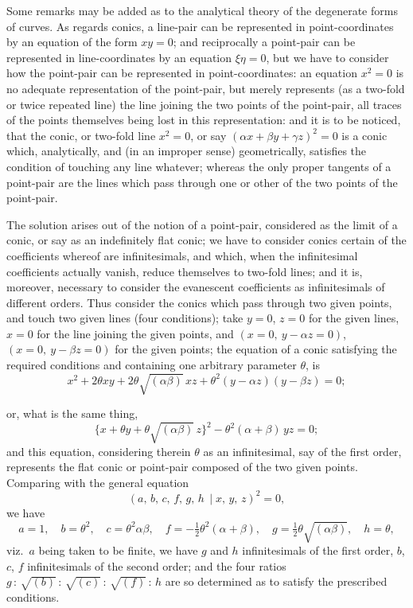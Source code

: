 \documentclass[11pt]{article}
\begin{document}
\medskip
\noindent
Some remarks may be added as to the analytical theory of the degenerate forms
of curves. As regards conics, a line-pair can be represented in
point-coordinates by an equation of the form $xy = 0$; and reciprocally a
point-pair can be represented in line-coordinates by an equation $\xi\eta = 0$,
but we have to consider how the point-pair can be represented in
point-coordinates: an equation $x^{2} = 0$ is no adequate representation of
the point-pair, but merely represents (as a two-fold or twice repeated line)
the line joining the two points of the point-pair, all traces of the points
themselves being lost in this representation: and it is to be noticed, that
the conic, or two-fold line $x^{2} = 0$, or say
$(\alpha x + \beta y + \gamma z)^{2} = 0$ is a conic which, analytically, and
(in an improper sense) geometrically, satisfies the condition of touching any
line whatever; whereas the only proper tangents of a point-pair are the lines
which pass through one or other of the two points of the point-pair.

The solution arises out of the notion of a point-pair, considered as the
limit of a conic, or say as an indefinitely flat conic; we have to consider
conics certain of the coefficients whereof are infinitesimals, and which,
when the infinitesimal coefficients actually vanish, reduce themselves to
two-fold lines; and it is, moreover, necessary to consider the evanescent
coefficients as infinitesimals of different orders. Thus consider the conics
which pass through two given points, and touch two given lines (four
conditions); take $y = 0$, $z = 0$ for the given lines, $x = 0$ for the line
joining the given points, and $(x = 0,\ y - \alpha z = 0)$,
$(x = 0,\ y - \beta z = 0)$ for the given points; the equation of a conic
satisfying the required conditions and containing one arbitrary parameter
$\theta$, is
\[
  x^{2} + 2\theta x y + 2\theta\sqrt{(\alpha\beta)}\,x z
  + \theta^{2}(y - \alpha z)(y - \beta z) = 0;
\]

\bigskip
\noindent
or, what is the same thing,
\[
  \{x + \theta y + \theta\sqrt{(\alpha\beta)}\,z\}^{2}
  - \theta^{2}(\alpha + \beta)\,y z = 0;
\]
and this equation, considering therein $\theta$ as an infinitesimal, say of
the first order, represents the flat conic or point-pair composed of the two
given points. Comparing with the general equation
\[
  (a,\, b,\, c,\, f,\, g,\, h\, \mid x,\, y,\, z)^{2} = 0,
\]
we have
\[
  a = 1,\quad b = \theta^{2},\quad c = \theta^{2}\alpha\beta,\quad
  f = -\tfrac{1}{2}\theta^{2}(\alpha + \beta),\quad
  g = \tfrac{1}{2}\theta\sqrt{(\alpha\beta)},\quad h = \theta,
\]
viz.\ $a$ being taken to be finite, we have $g$ and $h$ infinitesimals of the
first order, $b$, $c$, $f$ infinitesimals of the second order; and the four
ratios $g\,:\,\sqrt{(b)}\,:\,\sqrt{(c)}\,:\,\sqrt{(f)}\,:\,h$ are so
determined as to satisfy the prescribed conditions.
\end{document}
